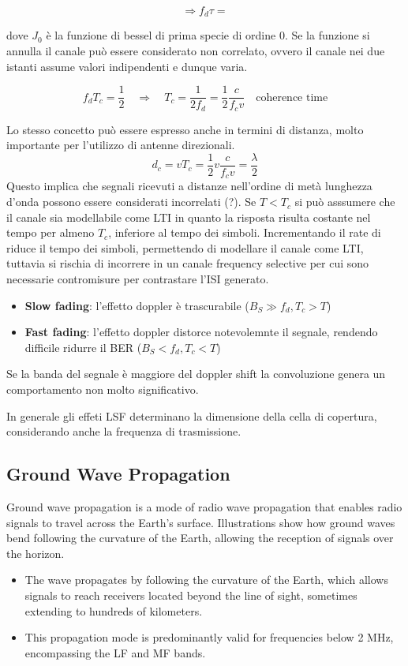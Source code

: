 \[
    \Rightarrow f_d \tau = 
\]


dove $J_0$ è la funzione di bessel di prima specie di ordine 0.  Se la funzione si annulla il canale può essere considerato non correlato, ovvero il canale nei due istanti assume valori indipendenti e dunque varia.


\[
    f_d T_c = \frac{1}{2} \quad \Rightarrow \quad  T_c = \frac{1}{2 f_d} = \frac{1}{2} \frac{c}{f_c v} \quad \text{coherence time}
\]

Lo stesso concetto può essere espresso anche in termini di distanza, molto importante per l'utilizzo di antenne direzionali.
\[
    d_c = v T_c = \frac{1}{2} v \frac{c}{f_c v} = \frac{\lambda}{2}
\]
Questo implica che segnali ricevuti a distanze nell'ordine di metà lunghezza d'onda possono essere considerati incorrelati (?).
Se $T < T_c$ si può asssumere che il canale sia modellabile come LTI in quanto la risposta risulta costante nel tempo per almeno $T_c$, inferiore al tempo dei simboli.
Incrementando il rate di riduce il tempo dei simboli, permettendo di modellare il canale come LTI, tuttavia si rischia di incorrere in un canale frequency selective per cui sono necessarie contromisure per contrastare l'ISI generato.  

\begin{itemize}
    \item \textbf{Slow fading}: l'effetto doppler è trascurabile ($B_S \gg f_d, T_c > T$)
    \item \textbf{Fast fading}: l'effetto doppler distorce notevolemnte il segnale, rendendo difficile ridurre il BER ($B_S < f_d, T_c < T$)
\end{itemize}
Se la banda del segnale è maggiore del doppler shift la convoluzione genera un comportamento non molto significativo.

In generale gli effeti LSF determinano la dimensione della cella di copertura, considerando anche la frequenza di trasmissione.



\subsection*{Ground Wave Propagation}
Ground wave propagation is a mode of radio wave propagation that enables radio signals to travel across the Earth's surface. Illustrations show how ground waves bend following the curvature of the Earth, allowing the reception of signals over the horizon.

\begin{itemize}
    \item The wave propagates by following the curvature of the Earth, which allows signals to reach receivers located beyond the line of sight, sometimes extending to hundreds of kilometers.
    \item This propagation mode is predominantly valid for frequencies below 2 MHz, encompassing the LF and MF bands.
\end{itemize}


